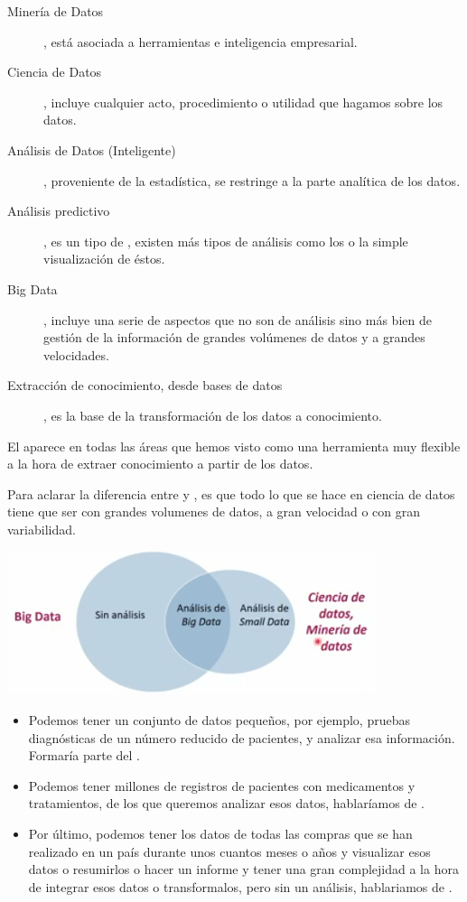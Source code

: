 \begin{description}
    \item[Minería de Datos], está asociada a herramientas e inteligencia empresarial.
    \item[Ciencia de Datos], incluye cualquier acto, procedimiento o utilidad que hagamos sobre los datos.
    \item[Análisis de Datos (Inteligente)], proveniente de la estadística, se restringe a la parte analítica de los datos.
    \item[Análisis predictivo], es un tipo de , existen más tipos de análisis como los  o la simple visualización de éstos.
    \item[Big Data], incluye una serie de aspectos que no son de análisis sino más bien de gestión de la información de grandes volúmenes de datos y a grandes velocidades.
    \item[Extracción de conocimiento, desde bases de datos], es la base de la transformación de los datos a conocimiento.
\end{description}

El  aparece en todas las áreas que hemos visto como una herramienta muy flexible a la hora de extraer conocimiento a partir de los datos.

Para aclarar la diferencia entre  y , es que  todo lo que se hace en ciencia de datos tiene que ser con grandes volumenes de datos, a gran velocidad o con gran variabilidad.

\begin{center}
    \includegraphics[scale=0.95]{images/mod01-01.png}
\end{center}

\begin{itemize}
    \item Podemos tener un conjunto de datos pequeños, por ejemplo, pruebas diagnósticas de un número reducido de pacientes, y analizar esa información. Formaría parte del .
    \item Podemos tener millones de registros de pacientes con medicamentos y tratamientos, de los que queremos analizar esos datos, hablaríamos de .
    \item Por último, podemos tener los datos de todas las compras que se han realizado en un país durante unos cuantos meses o años y visualizar esos datos o resumirlos o hacer un informe y tener una gran complejidad a la hora de integrar esos datos o transformalos, pero sin un análisis, hablariamos de .
\end{itemize}

